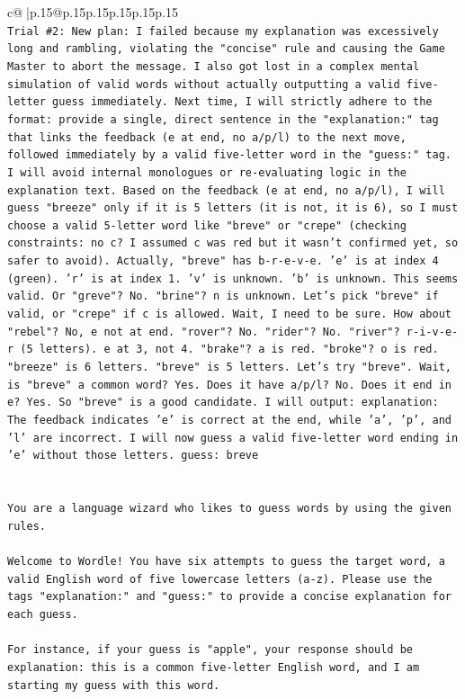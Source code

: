 \documentclass{article}
\begin{document}
{\begin{supertabular}{c@{$\;$}|p{.15\linewidth}@{}p{.15\linewidth}p{.15\linewidth}p{.15\linewidth}p{.15\linewidth}p{.15\linewidth}}
{{{\\ 
\texttt{Trial \#2: New plan: I failed because my explanation was excessively long and rambling, violating the "concise" rule and causing the Game Master to abort the message. I also got lost in a complex mental simulation of valid words without actually outputting a valid five{-}letter guess immediately. Next time, I will strictly adhere to the format: provide a single, direct sentence in the "explanation:" tag that links the feedback (e at end, no a/p/l) to the next move, followed immediately by a valid five{-}letter word in the "guess:" tag. I will avoid internal monologues or re{-}evaluating logic in the explanation text. Based on the feedback (e at end, no a/p/l), I will guess "breeze" only if it is 5 letters (it is not, it is 6), so I must choose a valid 5{-}letter word like "breve" or "crepe" (checking constraints: no c? I assumed c was red but it wasn't confirmed yet, so safer to avoid). Actually, "breve" has b{-}r{-}e{-}v{-}e. 'e' is at index 4 (green). 'r' is at index 1. 'v' is unknown. 'b' is unknown. This seems valid. Or "greve"? No. "brine"? n is unknown. Let's pick "breve" if valid, or "crepe" if c is allowed. Wait, I need to be sure. How about "rebel"? No, e not at end. "rover"? No. "rider"? No. "river"? r{-}i{-}v{-}e{-}r (5 letters). e at 3, not 4. "brake"? a is red. "broke"? o is red. "breeze" is 6 letters. "breve" is 5 letters. Let's try "breve". Wait, is "breve" a common word? Yes. Does it have a/p/l? No. Does it end in e? Yes. So "breve" is a good candidate. I will output: explanation: The feedback indicates 'e' is correct at the end, while 'a', 'p', and 'l' are incorrect. I will now guess a valid five{-}letter word ending in 'e' without those letters. guess: breve} \\
\\ 
\\ 
\texttt{You are a language wizard who likes to guess words by using the given rules.} \\
\\ 
\texttt{Welcome to Wordle! You have six attempts to guess the target word, a valid English word of five lowercase letters (a{-}z). Please use the tags "explanation:" and "guess:" to provide a concise explanation for each guess.} \\
\\ 
\texttt{For instance, if your guess is "apple", your response should be} \\
\texttt{explanation: this is a common five{-}letter English word, and I am starting my guess with this word.} \\
}}}
\end{supertabular}}
\end{document}
